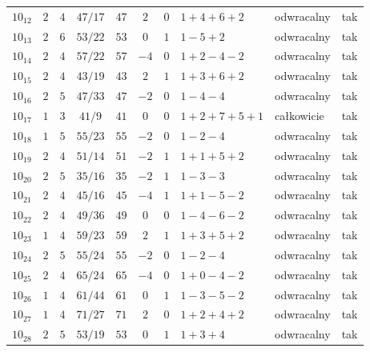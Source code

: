 \begin{longtable}{lccccccllc}
$10_{12}$   &  $2$     &  $4$  &  $47/17$  &  $47$   &  $2$   &  $0$  &  $1+4+6+2$      &  odwracalny  &  tak  \\
$10_{13}$   &  $2$     &  $6$  &  $53/22$  &  $53$   &  $0$   &  $1$  &  $1-5+2$        &  odwracalny  &  tak  \\
$10_{14}$   &  $2$     &  $4$  &  $57/22$  &  $57$   &  $-4$  &  $0$  &  $1+2-4-2$      &  odwracalny  &  tak  \\
$10_{15}$   &  $2$     &  $4$  &  $43/19$  &  $43$   &  $2$   &  $1$  &  $1+3+6+2$      &  odwracalny  &  tak  \\
$10_{16}$   &  $2$     &  $5$  &  $47/33$  &  $47$   &  $-2$  &  $0$  &  $1-4-4$        &  odwracalny  &  tak  \\
$10_{17}$   &  $1$     &  $3$  &  $41/9$   &  $41$   &  $0$   &  $0$  &  $1+2+7+5+1$    &  całkowicie  &  tak  \\
$10_{18}$   &  $1$     &  $5$  &  $55/23$  &  $55$   &  $-2$  &  $0$  &  $1-2-4$        &  odwracalny  &  tak  \\
$10_{19}$   &  $2$     &  $4$  &  $51/14$  &  $51$   &  $-2$  &  $1$  &  $1+1+5+2$      &  odwracalny  &  tak  \\
$10_{20}$   &  $2$     &  $5$  &  $35/16$  &  $35$   &  $-2$  &  $1$  &  $1-3-3$        &  odwracalny  &  tak  \\
$10_{21}$   &  $2$     &  $4$  &  $45/16$  &  $45$   &  $-4$  &  $1$  &  $1+1-5-2$      &  odwracalny  &  tak  \\
$10_{22}$   &  $2$     &  $4$  &  $49/36$  &  $49$   &  $0$   &  $0$  &  $1-4-6-2$      &  odwracalny  &  tak  \\
$10_{23}$   &  $1$     &  $4$  &  $59/23$  &  $59$   &  $2$   &  $1$  &  $1+3+5+2$      &  odwracalny  &  tak  \\
$10_{24}$   &  $2$     &  $5$  &  $55/24$  &  $55$   &  $-2$  &  $0$  &  $1-2-4$        &  odwracalny  &  tak  \\
$10_{25}$   &  $2$     &  $4$  &  $65/24$  &  $65$   &  $-4$  &  $0$  &  $1+0-4-2$      &  odwracalny  &  tak  \\
$10_{26}$   &  $1$     &  $4$  &  $61/44$  &  $61$   &  $0$   &  $1$  &  $1-3-5-2$      &  odwracalny  &  tak  \\
$10_{27}$   &  $1$     &  $4$  &  $71/27$  &  $71$   &  $2$   &  $0$  &  $1+2+4+2$      &  odwracalny  &  tak  \\
$10_{28}$   &  $2$     &  $5$  &  $53/19$  &  $53$   &  $0$   &  $1$  &  $1+3+4$        &  odwracalny  &  tak  \\

\end{longtable}
